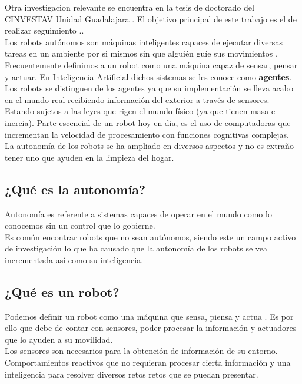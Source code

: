 \documentclass[11pt,epsf,times]{article}
\begin{document}
Otra investigacion relevante se encuentra en la tesis de doctorado del CINVESTAV Unidad Guadalajara \cite{CINVES2021, CINVES2015}.
El objetivo principal de este trabajo es el de realizar seguimiento ..\\


Los robots aut\'{o}nomos son m\'{a}quinas inteligentes capaces de ejecutar diversas tareas en un ambiente por si mismos sin que algui\'{e}n gu\'{i}e sus movimientos \cite{Bekey2005}. Frecuentemente definimos a un robot como una m\'{a}quina capaz de sensar, pensar y actuar. En Inteligencia Artificial dichos sistemas se les conoce como \textbf{agentes}. Los robots se distinguen de los agentes ya que su implementaci\'{o}n se lleva acabo en el mundo real recibiendo informaci\'{o}n del exterior a trav\'{e}s de sensores. Estando sujetos a las leyes que rigen el mundo f\'{i}sico (ya que tienen masa e inercia). Parte escencial de un robot hoy en dia, es el uso de computadoras que incrementan la velocidad de procesamiento con funciones cognitivas complejas.\\

La autonom\'{i}a de los robots se ha ampliado en diversos aspectos y no es extra\~{n}o tener uno que ayuden en la limpieza del hogar.

\subsection*{¿Qu\'{e} es la autonom\'{i}a?}

  Autonom\'{i}a es referente a sistemas capaces de operar en el mundo como lo conocemos sin un control que lo gobierne.\\

  Es com\'{u}n encontrar robots que no sean aut\'{o}nomos, siendo este un campo activo de investigaci\'{o}n lo que ha causado que la autonom\'{i}a de los robots se vea incrementada as\'{i} como su inteligencia.

\subsection*{¿Qu\'{e} es un robot?}

  Podemos definir un robot como una m\'{a}quina que sensa, piensa y actua \cite{Bekey2005}. Es por ello que debe de contar con sensores, poder procesar la informaci\'{o}n y actuadores que lo ayuden a su movilidad.\\
  Los sensores son necesarios para la obtenci\'{o}n de informaci\'{o}n de su entorno. Comportamientos reactivos que no requieran procesar cierta informaci\'{o}n y una inteligencia para resolver diversos retos retos que se puedan presentar.
\end{document}
